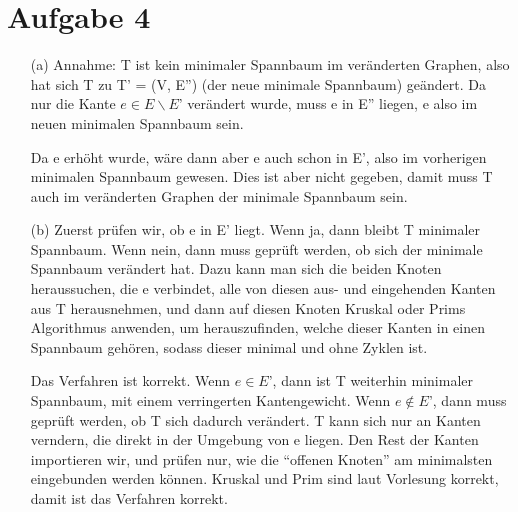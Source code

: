 \documentclass{article}
\begin{document}
\section*{Aufgabe 4}

\begin{enumerate}
\item[(a)]
Annahme: T ist kein minimaler Spannbaum im veränderten Graphen, also 
hat sich T zu T' = (V, E'') (der neue minimale Spannbaum) geändert. 
Da nur die Kante $e \in E \backslash E$' verändert wurde, muss e in E''
liegen, e also im neuen minimalen Spannbaum sein.

Da e erhöht wurde, wäre dann aber e auch schon in E', also im 
vorherigen minimalen Spannbaum gewesen. Dies ist aber nicht 
gegeben, damit muss T auch im veränderten Graphen der minimale 
Spannbaum sein.
  
\item[(b)]
Zuerst prüfen wir, ob e in E' liegt. Wenn ja, dann bleibt T minimaler 
Spannbaum. 
Wenn nein, dann muss geprüft werden, ob sich der minimale Spannbaum 
verändert hat.  
Dazu kann man sich die beiden Knoten heraussuchen, die e verbindet, 
alle von diesen aus- und eingehenden Kanten aus T herausnehmen, und dann
auf diesen Knoten Kruskal oder Prims Algorithmus anwenden, um 
herauszufinden, welche dieser Kanten in einen Spannbaum gehören, sodass 
dieser minimal und ohne Zyklen ist.

Das Verfahren ist korrekt. Wenn $e \in E$', dann ist T weiterhin 
minimaler Spannbaum, mit einem verringerten Kantengewicht. Wenn $e 
\notin E$', dann muss geprüft werden, ob T sich dadurch verändert. 
T kann sich nur an Kanten verndern, die direkt in der Umgebung von 
e liegen. Den Rest der Kanten importieren wir, und prüfen nur, wie 
die "`offenen Knoten"' am minimalsten eingebunden werden können. 
Kruskal und Prim sind laut Vorlesung korrekt, damit ist das 
Verfahren korrekt.
 
\end{enumerate}
\end{document}
